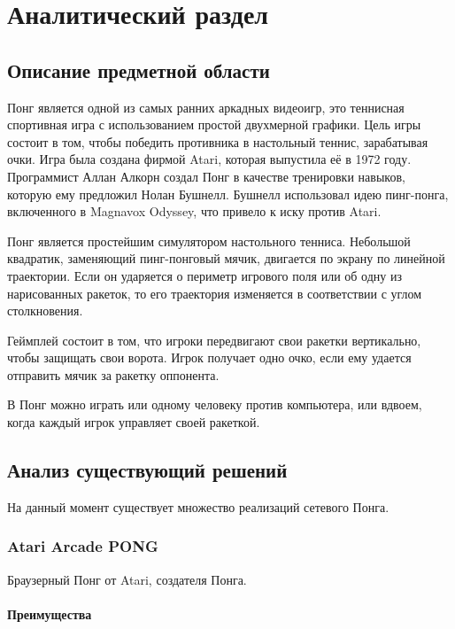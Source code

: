 \chapter{Аналитический раздел}
\label{cha:analysis}

\section{Описание предметной области}

Понг является одной из самых ранних аркадных видеоигр, это теннисная спортивная игра с использованием простой двухмерной графики. Цель игры состоит в том, чтобы победить противника в настольный теннис, зарабатывая очки. Игра была создана фирмой Atari, которая выпустила её в 1972 году. Программист Аллан Алкорн создал Понг в качестве тренировки навыков, которую ему предложил Нолан Бушнелл. Бушнелл использовал идею пинг-понга, включенного в Magnavox Odyssey, что привело к иску против Atari\cite{WikiPong}.

Понг является простейшим симулятором настольного тенниса. Небольшой квадратик, заменяющий пинг-понговый мячик, двигается по экрану по линейной траектории. Если он ударяется о периметр игрового поля или об одну из нарисованных ракеток, то его траектория изменяется в соответствии с углом столкновения.

Геймплей состоит в том, что игроки передвигают свои ракетки вертикально, чтобы защищать свои ворота. Игрок получает одно очко, если ему удается отправить мячик за ракетку оппонента.

В Понг можно играть или одному человеку против компьютера, или вдвоем, когда каждый игрок управляет своей ракеткой.

\section{Анализ существующий решений}

На данный момент существует множество реализаций сетевого Понга.

\subsection{Atari Arcade PONG}

Браузерный Понг от Atari, создателя Понга.

\subsubsection{Преимущества}

